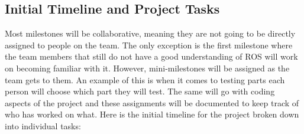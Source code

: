 \documentclass[conference]{IEEEtran}
\begin{document}
\subsection{Initial Timeline and Project Tasks}\label{AA}
Most milestones will be collaborative, meaning they are not going to be directly assigned to people on the team. The only exception is the first milestone where the team members that still do not have a good understanding of ROS will work on becoming familiar with it. However, mini-milestones will be assigned as the team gets to them. An example of this is when it comes to testing parts each person will choose which part they will test. The same will go with coding aspects of the project and these assignments will be documented to keep track of who has worked on what. Here is the initial timeline for the project broken down into individual tasks:
\end{document}

